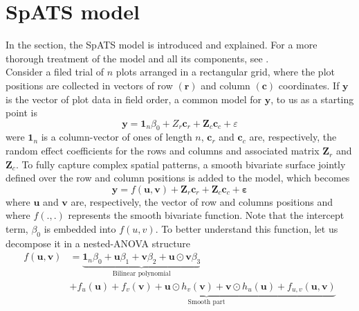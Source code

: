 \section{SpATS model}
In the section, the SpATS model is introduced and explained. For a more thorough treatment of the model and all its components, see \textcite{rodriguez2016spatial}.\\
Consider a filed trial of $n$ plots arranged in a rectangular grid, where the plot positions are collected in vectors of row $(\mathbf{r})$ and column $(\mathbf{c})$ coordinates. If $\mathbf{y}$ is the vector of plot data in field order, a common model for $\mathbf{y}$, to us as a starting point is
\begin{equation}
    \boldsymbol{y}=\mathbf{1}_{n} \beta_{0}+Z_{r} \boldsymbol{c}_{r}+\boldsymbol{Z}_{c} \boldsymbol{c}_{c}+\varepsilon
\end{equation}
were $\mathbf{1}_{n}$ is a column-vector of ones of length $n$, $\boldsymbol{c}_{r}$ and $\boldsymbol{c}_{c}$ are, respectively, the random effect coefficients for the rows and columns and associated matrix $\boldsymbol{Z}_{r}$ and $\boldsymbol{Z}_{c}$. To fully capture complex spatial patterns, a smooth bivariate surface jointly defined over the row and column positions is added to the model, which becomes
\begin{equation}
    \boldsymbol{y}=f(\boldsymbol{u}, \boldsymbol{v})+\boldsymbol{Z}_{r} \boldsymbol{c}_{r}+\boldsymbol{Z}_{c} \boldsymbol{c}_{c}+\boldsymbol{\varepsilon}
    \label{eq:base_model_bismooth_surface}
\end{equation}
where $\mathbf{u}$ and $\mathbf{v}$ are, respectively, the vector of row and columns positions and where $f(.,.)$ represents the smooth bivariate function. Note that the intercept term, $\beta_0$ is embedded into $f(u,v)$. To better understand this function, let us decompose it in a nested-ANOVA structure
\begin{align}
f ( \boldsymbol { u } , \boldsymbol { v } ) & = \underbrace { \mathbf { 1 } _ { n } \beta _ { 0 } + \boldsymbol { u } \beta _ { 1 } + \boldsymbol { v } \beta _ { 2 } + \boldsymbol { u } \odot \boldsymbol { v } \beta _ { 3 } } _ { \text { Bilinear polynomial } } \nonumber \\
 & + \underbrace { f _ { u } ( \boldsymbol { u } ) + f _ { v } ( \boldsymbol { v } ) + \boldsymbol { u } \odot h _ { v } ( \boldsymbol { v } ) + \boldsymbol { v } \odot h _ { u } ( \boldsymbol { u } ) + f _ { u , v } ( \boldsymbol { u } , \boldsymbol { v } ) }_{\text{Smooth part}}
 \label{eq:full_bivariate_smooth_surface_model}
\end{align}
